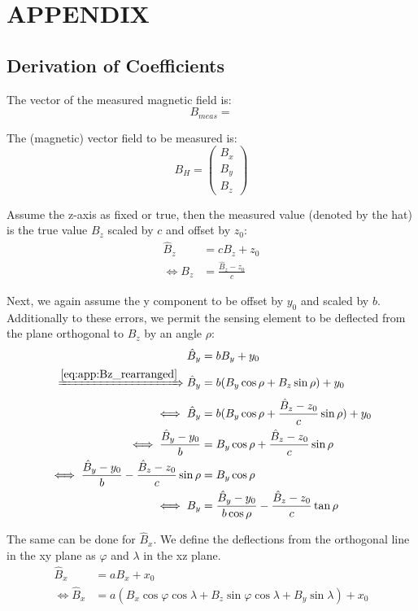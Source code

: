 \chapter{APPENDIX \label{ch:appendix}}

\section{Derivation of Coefficients \label{sec:app:deriv_of_coeff}}
The vector of the measured magnetic field is:
\begin{equation}
    B_{meas}=
\end{equation}


The (magnetic) vector field to be measured is:
\begin{equation}
    B_H=\begin{pmatrix} B_x \\ B_y \\ B_z \end{pmatrix}
\end{equation}

Assume the z-axis as fixed or true, then the measured value (denoted by the hat) is the true value $B_z$ scaled by $c$ and offset by $z_0$:
\begin{align}
    \hat{B}_z&=cB_z+z_0 \\
    \iff B_z&=\frac{\hat{B}_z-z_0}{c}
    \label{eq:app:Bz_rearranged}
\end{align}

Next, we again assume the y component to be offset by $y_0$ and scaled by $b$. Additionally to these errors, we permit the sensing element to be deflected from the plane orthogonal to $B_z$ by an angle $\rho$:
\begin{align}
    \hat{B}_y&=b B_y+y_0 \\
    \xRightarrow{\eqref{eq:app:Bz_rearranged}} \hat{B}_y&=b(B_y\cos\rho+B_z\sin\rho)+y_0 \\
    \iff \hat{B}_y&=b(B_y\cos\rho+\frac{\hat{B}_z-z_0}{c}\sin\rho)+y_0 \\
    \iff \frac{\hat{B}_y-y_0}{b}&=B_y\cos\rho+\frac{\hat{B}_z-z_0}{c}\sin\rho \\
    \iff \frac{\hat{B}_y-y_0}{b}-\frac{\hat{B}_z-z_0}{c}\sin\rho&=B_y\cos\rho \\
    \iff B_y &= \frac{\hat{B}_y-y_0}{b\cos\rho}-\frac{\hat{B}_z-z_0}{c}\tan\rho
    \label{eq:app:By_rearranged}
\end{align}

The same can be done for $\hat{B}_x$. We define the deflections from the orthogonal line in the xy plane as $\varphi$ and $\lambda$ in the xz plane.
\begin{align}
    \hat{B}_x&=aB_x+x_0 \\
    \iff \hat{B}_x & = a(B_x\cos\varphi\cos\lambda+B_z\sin\varphi\cos\lambda+B_y\sin\lambda)+x_0
\end{align}

